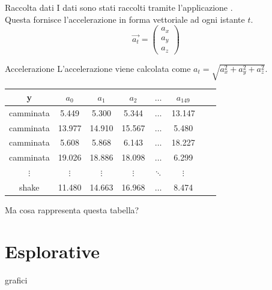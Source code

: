 \documentclass{beamer}
\begin{document}
\begin{frame}{Raccolta dati}
I dati sono stati raccolti tramite l'applicazione \cite{kumarPhonePiSampleServer2019}.\\
\smallskip
Questa fornisce l'accelerazione in forma vettoriale ad ogni istante $t$.
\[
\vec{a_t} = \begin{pmatrix}
a_x \\ a_y \\ a_z
\end{pmatrix}
\]
\end{frame}

\begin{frame}{Accelerazione}
L'accelerazione viene calcolata come $a_t =\sqrt{a_x^2+a_y^2+a_z^2}$.
\begin{table}[H]
\begin{tabular}{cccccccc}
\toprule
y & $a_0$ & $a_1$ & $a_2$  & $\dots$ & $a_{149}$\\
\midrule
camminata & 5.449 & 5.300 & 5.344 &  $\dots$ & 13.147\\

camminata & 13.977 & 14.910 & 15.567 &  $\dots$ & 5.480\\

camminata & 5.608 & 5.868 & 6.143 &  $\dots$ & 18.227\\

camminata & 19.026 & 18.886 & 18.098 &  $\dots$ & 6.299\\

$\vdots$ & $\vdots$ & $\vdots$ & $\vdots$ &  $\ddots$ & $\vdots$\\

shake & 11.480 & 14.663 & 16.968 &  $\dots$ & 8.474\\

\bottomrule
\end{tabular}
\end{table}
Ma cosa rappresenta questa tabella?
\end{frame}

\section{Esplorative}
\begin{frame}
grafici
\end{frame}
\end{document}
